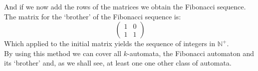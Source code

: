 \documentclass{article}
\begin{document}
And if we now add the rows of the matrices we obtain the Fibonacci sequence.
The matrix for the `brother' of the Fibonacci sequence is:
\begin{displaymath} \left( \begin{array}{cc}
1 & 0\\
1 & 1
\end{array} \right) \end{displaymath}
Which applied to the initial matrix yields the sequence of integers in $\mathbb{N}^+$.\\
By using this method we can cover all $k$-automata, the Fibonacci automaton and
its `brother' and, as we shall see, at least one one other class of automata.

%
%
\end{document}
